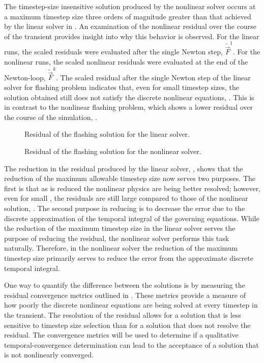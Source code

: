 The timestep-size insensitive solution produced by the nonlinear solver occurs at a maximum timestep size three orders of magnitude greater than that achieved by the linear solver in \cobra{}.
An examination of the nonlinear residual over the course of the transient provides insight into why this behavior is observed.
For the linear runs, the scaled residuals were evaluated after the single Newton step, $\tilde{\vec{F}}^{1}$.
For the nonlinear runs, the scaled nonlinear residuals were evaluated at the end of the Newton-loop, $\tilde{\vec{F}}^{k}$.
The scaled residual after the single Newton step of the linear solver for flashing problem indicates that, even for small timestep sizes, the solution obtained still does not satisfy the discrete nonlinear equations, .
This is in contrast to the nonlinear flashing problem, which shows a lower residual over the course of the simulation, .

\begin{figure}[h!tb]
\centering

\caption{Residual of the flashing solution for the linear solver.}
\label{fig:flashingResidualLin}
\end{figure}


\begin{figure}[h!tb]
\centering

\caption{Residual of the flashing solution for the nonlinear solver.}
\label{fig:flashingResidualNln}
\end{figure}

The reduction in the residual produced by the linear solver, , shows that the reduction of the maximum allowable timestep size now serves two purposes.
The first is that as \dtmax{} is reduced the nonlinear physics are being better resolved; however, even for small \dtmax{}, the residuals are still large compared to those of the nonlinear solution, .
The second purpose in reducing \dtmax{} is to decrease the error due to the discrete approximation of the temporal integral of the governing equations.
While the reduction of the maximum timestep size in the linear solver serves the purpose of reducing the residual, the nonlinear solver performs this task naturally.
Therefore, in the nonlinear solver the reduction of the maximum timestep size primarily serves to reduce the error from the approximate discrete temporal integral.

One way to quantify the difference between the solutions is by measuring the residual convergence metrics outlined in .
These metrics provide a measure of how poorly the discrete nonlinear equations are being solved at every timestep in the transient.
The resolution of the residual allows for a solution that is less sensitive to timestep size selection than for a solution that does not resolve the residual.
The convergence metrics will be used to determine if a qualitative temporal-convergence determination can lead to the acceptance of a solution that is not nonlinearly converged.

